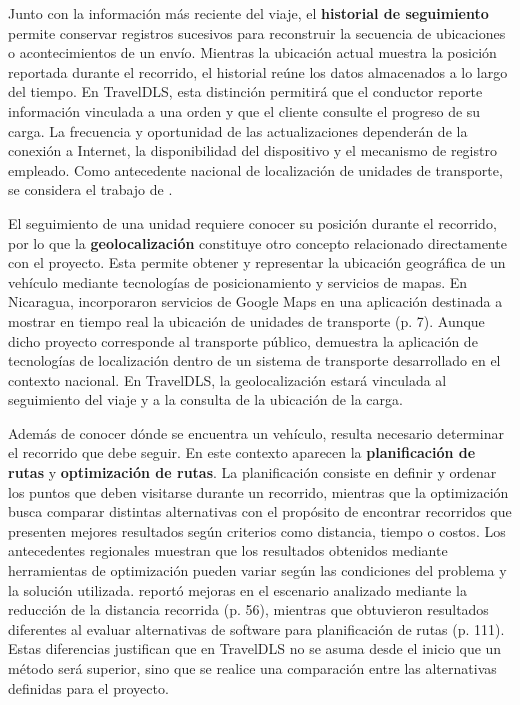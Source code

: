 Junto con la información más reciente del viaje, el \hypertarget{concepto-historial}{\textbf{historial de seguimiento}} permite conservar registros sucesivos para reconstruir la secuencia de ubicaciones o acontecimientos de un envío. Mientras la ubicación actual muestra la posición reportada durante el recorrido, el historial reúne los datos almacenados a lo largo del tiempo. En TravelDLS, esta distinción permitirá que el conductor reporte información vinculada a una orden y que el cliente consulte el progreso de su carga. La frecuencia y oportunidad de las actualizaciones dependerán de la conexión a Internet, la disponibilidad del dispositivo y el mecanismo de registro empleado. Como antecedente nacional de localización de unidades de transporte, se considera el trabajo de \textcite{garcia2022desarrollo}.

El seguimiento de una unidad requiere conocer su posición durante el recorrido, por lo que la \hypertarget{concepto-geolocalizacion}{\textbf{geolocalización}} constituye otro concepto relacionado directamente con el proyecto. Esta permite obtener y representar la ubicación geográfica de un vehículo mediante tecnologías de posicionamiento y servicios de mapas. En Nicaragua, \textcite{garcia2022desarrollo} incorporaron servicios de Google Maps en una aplicación destinada a mostrar en tiempo real la ubicación de unidades de transporte (p. 7). Aunque dicho proyecto corresponde al transporte público, demuestra la aplicación de tecnologías de localización dentro de un sistema de transporte desarrollado en el contexto nacional. En TravelDLS, la geolocalización estará vinculada al seguimiento del viaje y a la consulta de la ubicación de la carga.

Además de conocer dónde se encuentra un vehículo, resulta necesario determinar el recorrido que debe seguir. En este contexto aparecen la \hypertarget{concepto-planificacion-rutas}{\textbf{planificación de rutas}} y \hypertarget{concepto-optimizacion-rutas}{\textbf{optimización de rutas}}. La planificación consiste en definir y ordenar los puntos que deben visitarse durante un recorrido, mientras que la optimización busca comparar distintas alternativas con el propósito de encontrar recorridos que presenten mejores resultados según criterios como distancia, tiempo o costos. Los antecedentes regionales muestran que los resultados obtenidos mediante herramientas de optimización pueden variar según las condiciones del problema y la solución utilizada. \textcite{aguilar2022optimizacion} reportó mejoras en el escenario analizado mediante la reducción de la distancia recorrida (p. 56), mientras que \textcite{hernandez2024evaluacion} obtuvieron resultados diferentes al evaluar alternativas de software para planificación de rutas (p. 111). Estas diferencias justifican que en TravelDLS no se asuma desde el inicio que un método será superior, sino que se realice una comparación entre las alternativas definidas para el proyecto.


